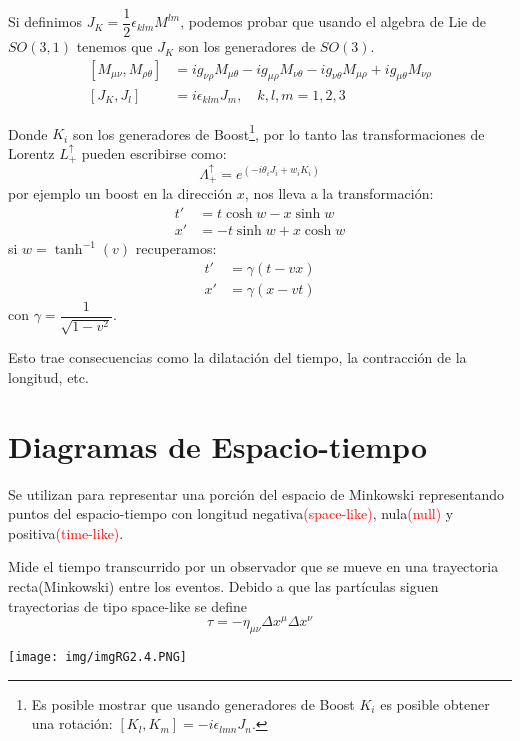 \documentclass[../main]{subfiles}
\begin{document}
\begin{adjustwidth}{0pt}{-100pt}
Si definimos $J_K=\dfrac{1}{2}\epsilon_{klm}M^{lm}$, podemos probar que usando el algebra de Lie de $SO(3, 1)$ tenemos que $J_K$ son los generadores de $SO(3)$.
\begin{equation}
    \begin{aligned}
        [M_{\mu\nu}, M_{\rho\theta}]&=ig_{\nu\rho}M_{\mu\theta}-ig_{\mu\rho}M_{\nu\theta}-ig_{\nu\theta}M_{\mu\rho}+ig_{\mu\theta}M_{\nu\rho}\\
        [J_K, J_l]&=i\epsilon_{klm} J_m,\quad k,l,m=1, 2, 3
    \end{aligned}
\end{equation}

Donde $K_i$ son los generadores de Boost\footnote{Es posible mostrar que usando generadores de Boost $K_i$ es posible obtener una rotación: $[K_l, K_m]=-i\epsilon_{lmn}J_n$.}, por lo tanto las transformaciones de Lorentz $L^{\uparrow}_{+}$ pueden escribirse como: 
\begin{equation}
    \Lambda^{\uparrow}_{+}=e^{(-i\theta_i J_i+w_i K_i)}
\end{equation}
por ejemplo un boost en la dirección $x$, nos lleva a la transformación:
\begin{equation}
    \begin{aligned}
        t'&=t\cosh w-x\sinh w\\
        x'&=-t\sinh w+x\cosh w
    \end{aligned}
\end{equation}
si $w=\tanh^{-1}(v)$ recuperamos:
\begin{equation}
    \begin{aligned}
        t'&=\gamma(t-vx)\\
        x'&=\gamma(x-vt)
    \end{aligned}
\end{equation}
con $\gamma=\dfrac{1}{\sqrt{1-v^2}}$.

Esto trae consecuencias como la dilatación del tiempo, la contracción de la longitud, etc.

\section{Diagramas de Espacio-tiempo}\label{part2.5}
Se utilizan para representar una porción del espacio de Minkowski representando puntos del espacio-tiempo con longitud negativa\textcolor{red}{(space-like)}, nula\textcolor{red}{(null)} y positiva\textcolor{red}{(time-like)}.

 Mide el tiempo transcurrido por un observador que se mueve en una trayectoria recta(Minkowski) entre los eventos. Debido a que las partículas siguen trayectorias de tipo space-like se define 
\begin{equation}
    \tau=-\eta_{\mu\nu} \Delta x^{\mu}\Delta x^{\nu}
\end{equation}
\begin{center}
    \texttt{[image: img/imgRG2.4.PNG]}
\end{center}


\end{adjustwidth}
\end{document}
